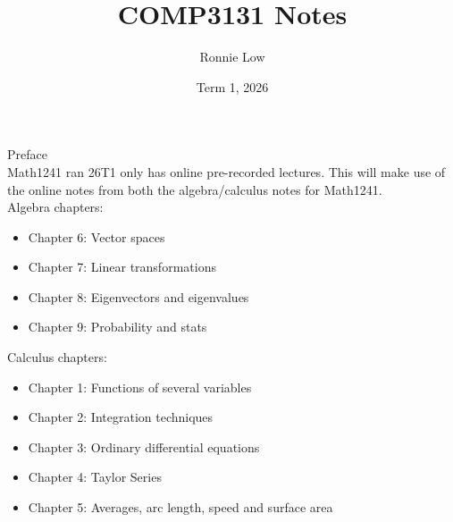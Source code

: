 \documentclass[journal, letterpaper]{IEEEtran}
\title{COMP3131 Notes}
\author{Ronnie Low}
\date{Term 1, 2026}
\begin{document}
\maketitle

\begin{theory}{Preface}\\
    Math1241 ran 26T1 only has online pre-recorded lectures. This will make use of the
    online notes from both the algebra/calculus notes for Math1241. \\

    Algebra chapters:
    \begin{itemize}
        \item Chapter 6: Vector spaces
        \item Chapter 7: Linear transformations
        \item Chapter 8: Eigenvectors and eigenvalues
        \item Chapter 9: Probability and stats
    \end{itemize}

    Calculus chapters:
    \begin{itemize}
        \item Chapter 1: Functions of several variables
        \item Chapter 2: Integration techniques
        \item Chapter 3: Ordinary differential equations
        \item Chapter 4: Taylor Series
        \item Chapter 5: Averages, arc length, speed and surface area
    \end{itemize}
\end{theory}
\end{document}
